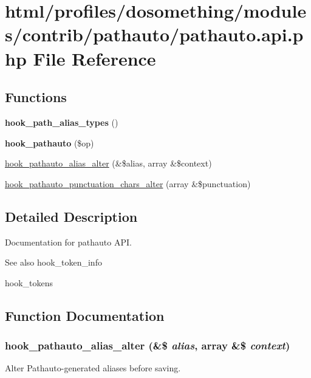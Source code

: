 \hypertarget{pathauto_8api_8php}{
\section{html/profiles/dosomething/modules/contrib/pathauto/pathauto.api.php File Reference}
\label{pathauto_8api_8php}
}
\subsection*{Functions}
\begin{DoxyCompactItemize}
\item 
\hypertarget{pathauto_8api_8php_a16fbd5227b2937cac2ba8c9f396880c9}{
{\bfseries hook\_\-path\_\-alias\_\-types} ()}
\label{pathauto_8api_8php_a16fbd5227b2937cac2ba8c9f396880c9}

\item 
\hypertarget{pathauto_8api_8php_af37425c61491a1d88d9bc3c9d091e054}{
{\bfseries hook\_\-pathauto} (\$op)}
\label{pathauto_8api_8php_af37425c61491a1d88d9bc3c9d091e054}

\item 
\hyperlink{pathauto_8api_8php_a7600070f06299fd7e1f9f33255d5947e}{hook\_\-pathauto\_\-alias\_\-alter} (\&\$alias, array \&\$context)
\item 
\hyperlink{pathauto_8api_8php_a9b3ef2a8def13dc74ca8ecffb2c7193c}{hook\_\-pathauto\_\-punctuation\_\-chars\_\-alter} (array \&\$punctuation)
\end{DoxyCompactItemize}


\subsection{Detailed Description}
Documentation for pathauto API.

\begin{DoxySeeAlso}{See also}
hook\_\-token\_\-info 

hook\_\-tokens 
\end{DoxySeeAlso}


\subsection{Function Documentation}
\hypertarget{pathauto_8api_8php_a7600070f06299fd7e1f9f33255d5947e}{
\subsubsection[{hook\_\-pathauto\_\-alias\_\-alter}]{\setlength{\rightskip}{0pt plus 5cm}hook\_\-pathauto\_\-alias\_\-alter (\&\$ {\em alias}, \/  array \&\$ {\em context})}}
\label{pathauto_8api_8php_a7600070f06299fd7e1f9f33255d5947e}
Alter Pathauto-\/generated aliases before saving.



